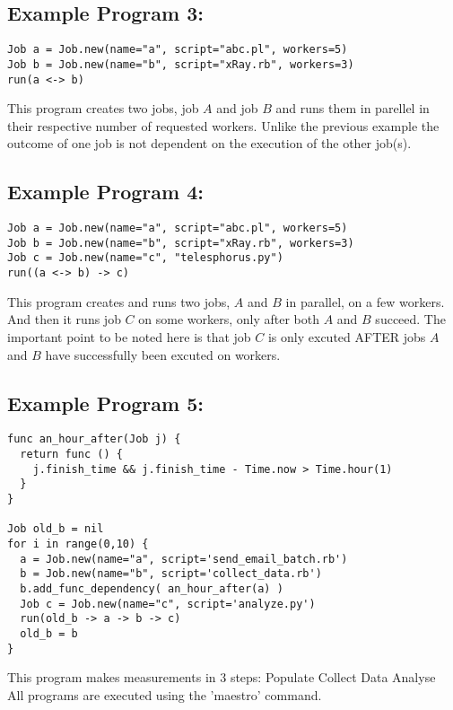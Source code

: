 \subsection*{Example Program 3:}
\begin{verbatim}
Job a = Job.new(name="a", script="abc.pl", workers=5)
Job b = Job.new(name="b", script="xRay.rb", workers=3)
run(a <-> b)
\end{verbatim}

This program creates two jobs, job $A$ and job $B$ and runs them in parellel in their respective number of requested workers.
Unlike the previous example the outcome of one job is not dependent on the execution of the other job(s).
\\

\subsection*{Example Program 4:}
\begin{verbatim}
Job a = Job.new(name="a", script="abc.pl", workers=5)
Job b = Job.new(name="b", script="xRay.rb", workers=3)
Job c = Job.new(name="c", "telesphorus.py")
run((a <-> b) -> c)
\end{verbatim}

This program creates and runs two jobs, $A$ and $B$ in parallel, on a few
workers. And then it runs job $C$ on some workers, only after both $A$
and $B$ succeed. The important point to be noted here is that job $C$ is 
only excuted AFTER jobs $A$ and $B$ have successfully been excuted on workers.
\\

\subsection*{Example Program 5:}
\begin{verbatim}
func an_hour_after(Job j) {
  return func () {
    j.finish_time && j.finish_time - Time.now > Time.hour(1)
  }
}

Job old_b = nil
for i in range(0,10) {
  a = Job.new(name="a", script='send_email_batch.rb')
  b = Job.new(name="b", script='collect_data.rb')
  b.add_func_dependency( an_hour_after(a) )
  Job c = Job.new(name="c", script='analyze.py')
  run(old_b -> a -> b -> c)
  old_b = b
}
\end{verbatim}
This program makes measurements in 3 steps:
Populate
Collect Data
Analyse
\\

All programs are executed using the 'maestro' command.
\\
